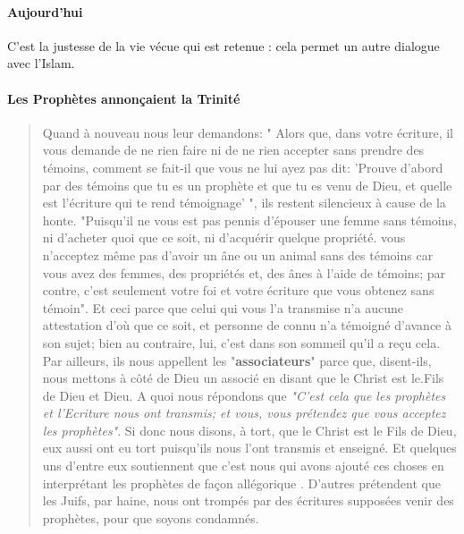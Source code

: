 \paragraph{Aujourd'hui} C'est la justesse de la vie vécue qui est retenue : cela permet un autre dialogue avec l'Islam.


    

\paragraph{Les Prophètes annonçaient la Trinité}
\begin{quote}
Quand à nouveau nous leur demandons: " Alors que, dans votre écriture, il vous demande de ne rien faire ni de ne rien accepter sans prendre des témoins, comment se fait-il que vous ne lui ayez pas dit: 'Prouve d'abord par des témoins que tu es un prophète et que tu es venu de Dieu, et quelle est l'écriture qui te rend
témoignage' ", ils restent silencieux à cause de la honte. "Puisqu'il ne vous est pas pennis d'épouser une femme sans témoins, ni d'acheter quoi que ce soit, ni d'acquérir quelque propriété. vous n'acceptez même pas d'avoir un âne ou un animal sans des témoins car vous avez des femmes, des propriétés et, des ânes à l'aide de témoins; par contre, c'est seulement votre foi et votre écriture que vous obtenez sans témoin". Et ceci parce que celui qui vous l'a transmise n'a aucune attestation d'où que ce soit, et personne de connu n'a témoigné d'avance à son sujet; bien au contraire, lui, c'est dans son sommeil qu'il a reçu cela. Par ailleurs, ils nous appellent les "\textbf{associateurs}" parce que, disent-ils, nous mettons à côté de Dieu un associé en disant que le Christ est le.Fils de Dieu et Dieu. A quoi nous répondons que \textit{"C'est cela que les prophètes et l'Ecriture nous ont transmis; et vous, vous prétendez que vous acceptez les prophètes"}. Si donc nous disons, à tort, que le Christ est le Fils de Dieu, eux aussi ont eu tort puisqu'ils nous l'ont transmis et enseigné. Et quelques uns d'entre eux soutiennent que c'est nous qui avons ajouté ces choses en interprétant les prophètes de façon allégorique . D'autres prétendent que les Juifs, par haine, nous ont trompés par des écritures supposées venir des prophètes, pour que soyons condamnés.
   
\end{quote}

